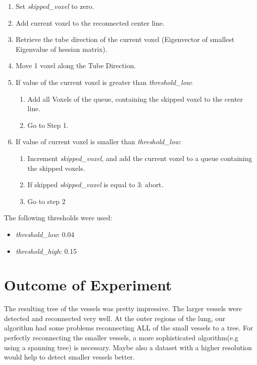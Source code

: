 \begin{enumerate}
 \item Set \textit{skipped\_voxel} to zero.
 \item Add current voxel to the reconnected center line.
 \item Retrieve the tube direction of the current voxel (Eigenvector of smallest Eigenvalue of hessian matrix).
 \item Move 1 voxel along the Tube Direction.
 \item If value of the current voxel is greater than \textit{threshold\_low}:
  \begin{enumerate}
    \item Add all Voxels of the queue, containing the skipped voxel to the center line.
    \item Go to Step 1.
  \end{enumerate}
 \item If value of current voxel is smaller than \textit{threshold\_low}:
  \begin{enumerate}
   \item Increment \textit{skipped\_voxel}, and add the current voxel to a queue
   containing the skipped voxels.
   \item If skipped \textit{skipped\_voxel} is equal to 3:  abort.
   \item Go to step 2   
  \end{enumerate}
\end{enumerate}

The following thresholds were used:
\begin{itemize}
 \item \textit{threshold\_low}: 0.04
 \item \textit{threshold\_high}: 0.15
\end{itemize}

\chapter{Outcome of Experiment}

The resulting tree of the vessels was pretty impressive. The larger vessels were
detected and reconnected very well. At the outer regions of the lung, our algorithm had some problems
reconnecting ALL of the small vessels to a tree.
For perfectly reconnecting the smaller vessels, a more sophisticated algorithm(e.g using a spanning tree) is necessary.
Maybe also a dataset with a higher resolution would help to detect smaller vessels better.

